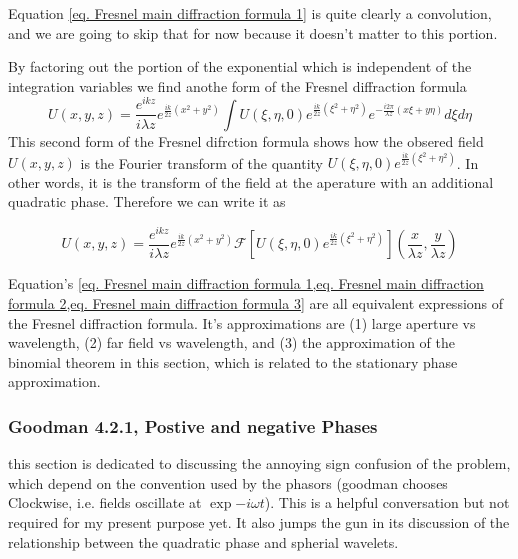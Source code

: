 \documentclass[../../main.tex]{subfiles}
\begin{document}
Equation \cref{eq. Fresnel main diffraction formula 1} is quite clearly a convolution, and we are going to skip that for now because it doesn't matter to this portion. 

By factoring out the portion of the exponential which is independent of the integration variables we find anothe form of the Fresnel diffraction formula
\begin{equation}\label{eq. Fresnel main diffraction formula 2}
    U(x,y,z)=\frac{e^{ikz}}{i\lambda z}e^{\frac{ik}{2 z}(x^2+y^2)}
    \int U(\xi,\eta,0)e^{ \frac{ik}{2z}(\xi^2+\eta^2)}e^{-\frac{i 2\pi}{\lambda z}(x\xi+y\eta)}
    d\xi d\eta
\end{equation}
This second form of the Fresnel difrction formula shows how the obsered field $U(x,y,z)$ is the Fourier transform of the quantity  $U(\xi,\eta,0)e^{ \frac{ik}{2z}(\xi^2+\eta^2)}$. In other words, it is the transform of the field at the aperature with an additional quadratic phase. Therefore we can write it as 

\begin{equation}\label{eq. Fresnel main diffraction formula 3}
    U(x,y,z)=\frac{e^{ikz}}{i\lambda z}e^{\frac{ik}{2 z}(x^2+y^2)}
    \mathcal{F}\left[U(\xi,\eta,0)e^{ \frac{ik}{2z}(\xi^2+\eta^2)}\right]\left(\frac{x}{\lambda z},\frac{y}{\lambda z}\right)
\end{equation}

Equation's \cref{eq. Fresnel main diffraction formula 1,eq. Fresnel main diffraction formula 2,eq. Fresnel main diffraction formula 3} are all equivalent expressions of the Fresnel diffraction formula. It's approximations are (1) large aperture vs wavelength, (2) far field vs wavelength, and (3) the approximation of the binomial theorem in this section, which is related to the stationary phase approximation. 

\subsubsection{Goodman 4.2.1, Postive and negative Phases}
this section is dedicated to discussing the annoying sign confusion of the problem, which depend on the convention used by the phasors (goodman chooses Clockwise, i.e. fields oscillate at $\exp{-i\omega t}$). This is a helpful conversation but not required for my present purpose yet. It also jumps the gun in its discussion of the relationship between the quadratic phase and spherial wavelets.
\end{document}
